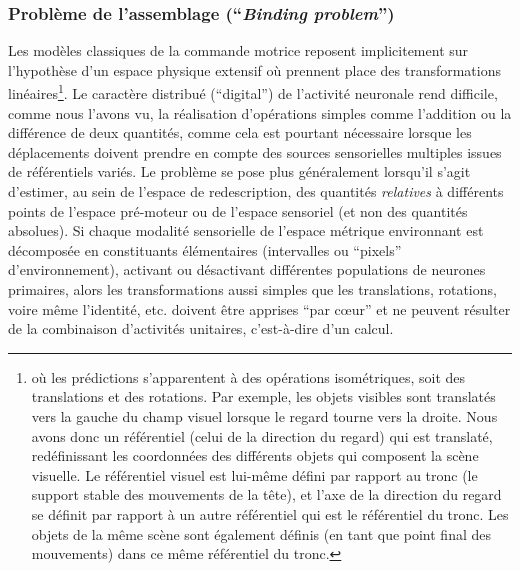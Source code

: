 \documentclass[11pt]{article}
\begin{document}
\subsubsection{Problème de l'assemblage (``\textit{Binding problem}'')}
Les modèles classiques de la commande motrice reposent implicitement sur l'hypothèse d'un espace physique extensif où prennent place des transformations linéaires\footnote{
	où les prédictions s'apparentent à des opérations isométriques, soit des translations et
	des rotations. Par exemple, les objets visibles sont translatés vers la gauche du champ visuel lorsque le regard  tourne
	vers la droite. Nous avons donc un référentiel (celui de la direction du regard) qui est translaté, redéfinissant
	les coordonnées des différents objets qui composent la scène visuelle. Le référentiel visuel est lui-même défini par rapport au
	tronc (le support stable des mouvements de la tête), et l'axe de la direction du regard se définit par rapport à un autre référentiel qui 
	est le référentiel du tronc. Les objets de la même scène sont également définis (en tant que point final des mouvements) dans
	ce même référentiel du tronc. 
}.  
Le caractère distribué (``digital'') de l'activité neuronale 
rend difficile, comme nous l'avons vu, la réalisation d'opérations simples comme l'addition ou la différence
	de deux quantités, comme cela est pourtant nécessaire lorsque les déplacements doivent prendre en compte des sources sensorielles 
	multiples issues de référentiels variés.
	Le problème se pose plus généralement lorsqu'il s'agit d'estimer, au sein de l'espace de redescription, des quantités \textit{relatives} à différents
	points de l'espace pré-moteur ou de l'espace sensoriel (et non des quantités absolues).
	Si chaque modalité sensorielle de l'espace métrique environnant 
	est décomposée en constituants élémentaires (intervalles ou ``pixels'' d'environnement), activant
	ou désactivant différentes populations de neurones primaires, 
	alors les transformations aussi simples que les translations, rotations, voire même l'identité, 
	etc. doivent être apprises ``par cœur'' \cite{Pouget1997} et ne peuvent résulter de la combinaison d'activités unitaires,
	c'est-à-dire d'un calcul.

\end{document}
